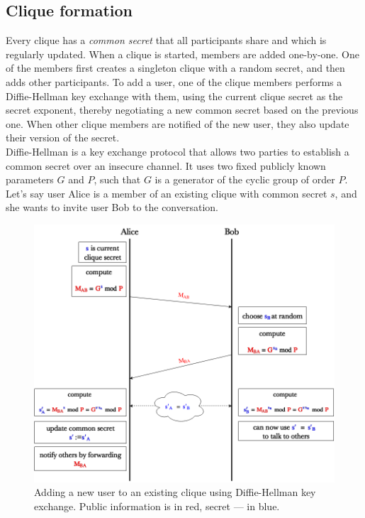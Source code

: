 \documentclass[a4paper, 12pt]{report}
\begin{document}
\subsection{Clique formation}
\label{subsec:prep.formation}
Every clique has a \emph{common secret} that all participants share and which is regularly updated. When a clique is started, members are added one-by-one. One of the members first creates a singleton clique with a random secret, and then adds other participants. To add a user, one of the clique members performs a Diffie-Hellman key exchange \cite{diffie1976new} with them, using the current clique secret as the secret exponent, thereby negotiating a new common secret based on the previous one. When other clique members are notified of the new user, they also update their version of the secret. \\

Diffie-Hellman is a key exchange protocol that allows two parties to establish a common secret over an insecure channel. It uses two fixed publicly known parameters $G$ and $P$, such that $G$ is a generator of the cyclic group of order $P$. Let's say user Alice is a member of an existing clique with common secret $s$, and she wants to invite user Bob to the conversation. 
\begin{figure}[h]
    \captionsetup{width=0.8\textwidth}
    \centering
    \includegraphics[width = 0.85 \linewidth]{pics/DH.png}
    \caption{Adding a new user to an existing clique using Diffie-Hellman key exchange. Public information is in {\color{red}red}, secret --- in {\color{blue}blue}.}
    \label{fig:DH}
\end{figure}
\end{document}
